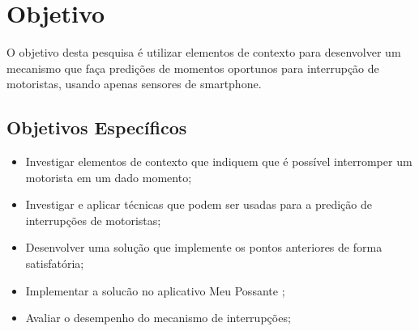 \chapter{Objetivo}
\label{objetivo}
O objetivo desta pesquisa é utilizar elementos de contexto para desenvolver um mecanismo que faça predições de
momentos oportunos para interrupção de motoristas, usando apenas sensores de smartphone.

\section{Objetivos Específicos}
\label{objetivos-esp}
\begin{itemize}
  \item Investigar elementos de contexto que indiquem que é possível interromper um motorista em um dado momento;
  \item Investigar e aplicar técnicas que podem ser usadas para a predição de interrupções de motoristas;
  \item Desenvolver uma solução que implemente os pontos anteriores de forma satisfatória;
  \item Implementar a solucão no aplicativo Meu Possante \cite{meupossante};
  \item Avaliar o desempenho do mecanismo de interrupções;
\end{itemize}
